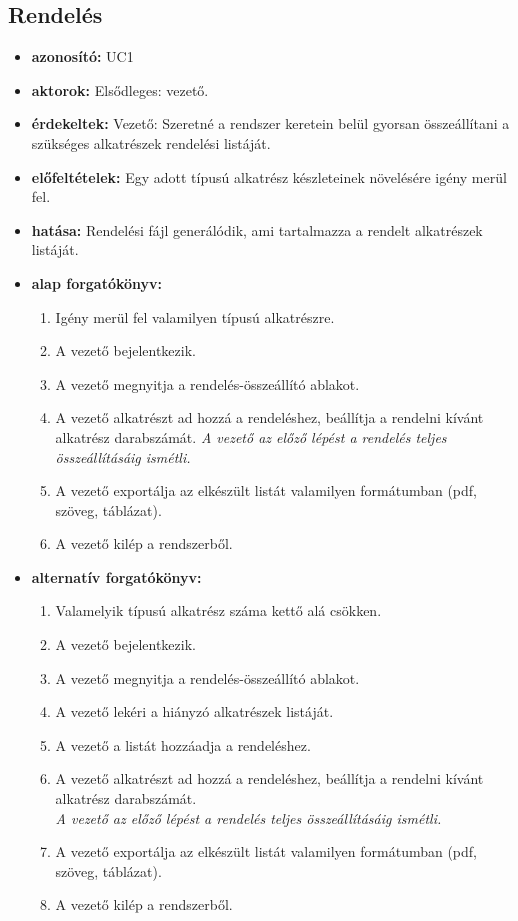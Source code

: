 \documentclass[12pt]{article}\usepackage[left=20mm,right=20mm,top=15mm,bottom=20mm]{geometry}
\begin{document}
\subsection{Rendelés}
\begin{itemize}
\item[] \textbf{azonosító: } UC1

\item[] \textbf{aktorok: } Elsődleges: vezető.  

\item[] \textbf{érdekeltek: } Vezető: Szeretné a rendszer keretein belül gyorsan összeállítani a szükséges alkatrészek rendelési listáját.

\item[] \textbf{előfeltételek: } Egy adott típusú alkatrész készleteinek növelésére igény merül fel.

\item[] \textbf{hatása: } Rendelési fájl generálódik, ami tartalmazza a rendelt alkatrészek listáját.

\item[] \textbf{alap forgatókönyv: }
\begin{enumerate}
\item Igény merül fel valamilyen típusú alkatrészre.
\item A vezető bejelentkezik.
\item A vezető megnyitja a rendelés-összeállító ablakot.
\item A vezető alkatrészt ad hozzá a rendeléshez, beállítja a rendelni kívánt alkatrész darabszámát.
\textit{A vezető az előző lépést a rendelés teljes összeállításáig ismétli.}
\item A vezető exportálja az elkészült listát valamilyen formátumban (pdf, szöveg, táblázat).
\item A vezető kilép a rendszerből.
\end{enumerate}

\item[] \textbf{alternatív forgatókönyv: }
\begin{enumerate}
\item Valamelyik típusú alkatrész száma kettő alá csökken.
\item A vezető bejelentkezik.
\item A vezető megnyitja a rendelés-összeállító ablakot.
\item A vezető lekéri a hiányzó alkatrészek listáját.
\item A vezető a listát hozzáadja a rendeléshez.
\item A vezető alkatrészt ad hozzá a rendeléshez, beállítja a rendelni kívánt alkatrész darabszámát. \\
\textit{A vezető az előző lépést a rendelés teljes összeállításáig ismétli.}
\item A vezető exportálja az elkészült listát valamilyen formátumban (pdf, szöveg, táblázat).
\item A vezető kilép a rendszerből.
\end{enumerate}


\end{itemize}
\end{document}
